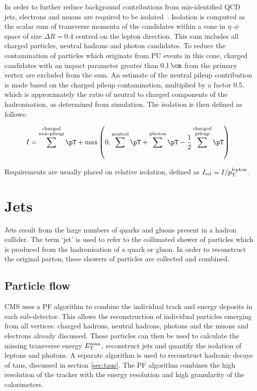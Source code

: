 In order to further reduce background contributions from mis-identified QCD jets,
electrons and muons are required to be isolated~\cite{CMS:2013hoa,MuonReco}. 
Isolation is computed as the scalar sum of transverse momenta of the candidates within a cone in
$\eta$--$\phi$ space of size $\Delta R = 0.4$ centred on the lepton direction. 
This sum includes all charged particles, neutral hadrons and photon candidates. 
To reduce the contamination of particles which originate from \ac{PU} events 
in this cone, charged  candidates with an impact parameter greater than 
$0.1\,\cm$ from the primary vertex are excluded from the sum. An estimate of the 
neutral pileup contribution is made based on the charged pileup contamination,
multiplied by a factor 0.5, which is approximately the ratio of neutral to
charged components of the hadronisation, as determined from simulation.   
The isolation is then defined as follows:

\begin{equation}
I = \sum^{\substack{\text{charged} \\ \text{non-pileup}}}\pT +
\text{max}\left(0,\sum^{\text{neutral}}\pT+\sum^{\text{photon}}\pT-\frac{1}{2}\sum^{\substack{\text{charged}
\\ \text{pileup}}}\pT\right).
\label{eq:leptonisolation}
\end{equation}

Requirements are usually placed on relative isolation, defined as
$I_{\text{rel}} = I / p_{\mathrm{T}}^{\text{lepton}}$. 

\section{Jets}
\label{sec:jets}

Jets result from the large numbers of quarks and gluons present in a hadron
collider. The term `jet' is used to refer to the collimated shower of particles
which is produced from the hadronisation of a quark or gluon. In order to
reconstruct the original parton, these showers of particles are collected
and combined. 

\subsection{Particle flow}
\label{sec:particleflow}

CMS uses a \ac{PF} \cite{CMS-PAS-PFT-09-001,CMS-PAS-PFT-10-001,CMS-PAS-PFT-10-002} 
algorithm to combine the individual track and energy deposits in each sub-detector. 
This allows the reconstruction of individual particles emerging from all vertices: charged
hadrons, neutral hadrons, photons and the muons and electrons already discussed.
These particles can then be 
used to calculate the missing transverse energy $E_{\mathrm{T}}^{\text{miss}}$,
reconstruct jets and quantify the isolation of leptons and photons. A separate
algorithm is used to reconstruct hadronic decays of taus, discussed in section
\ref{sec:taus}. The \ac{PF} algorithm combines the high resolution of
the tracker with the energy resolution and high granularity of the calorimeters.

